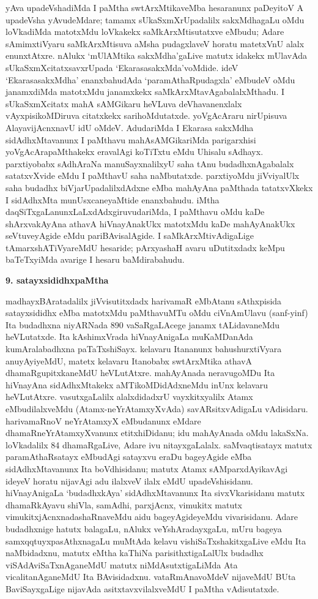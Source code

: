 yAva upadeVshadiMda I paMtha swtArxMtikaveMba hesaranunx paDeyitoV A upadeVsha yAvudeMdare; tamamx sUkaSxmXrUpadalilx sakxMdhagaLu oMdu loVkadiMda matotxMdu loVkakekx saMkArxMtisutatxve eMbudu; Adare sAmimxtiVyaru saMkArxMtisuva aMsha pudagxlaveV horatu matetxVnU alalx enunxtAtxre. nAlukx `mUlAMtika sakxMdha'gaLive matutx idakekx mUlavAda sUkaSxmXcitatxsavxrUpada `EkarasasakxMda'voMdide. ideV `EkarasasakxMdha' enanxbahudAda `paramAthaRpudagxla' eMbudeV oMdu janamxdiMda matotxMdu janamxkekx saMkArxMtavAgabalalxMthadu. I sUkaSxmXcitatx mahA sAMGikaru heVLuva deVhavanenxlalx vAyxpisikoMDiruva citatxkekx sarihoMdutatxde. yoVgAcAraru nirUpisuva AlayavijAcnxnavU idU oMdeV. AdudariMda I Ekarasa sakxMdha sidAdhxMtavanunx I paMthavu mahAsAMGikariMda parigarxhisi yoVgAcArapaMthakekx eravalAgi koTiTxtu eMdu Uhisalu sAdhayx. parxtiyobabx sAdhAraNa manuSayxnalilxyU saha tAnu budadhxnAgabalalx satatxvXvide eMdu I paMthavU saha naMbutatxde. parxtiyoMdu jiVviyalUlx saha budadhx biVjarUpadalilxdAdxne eMba mahAyAna paMthada tatatxvXkekx I sidAdhxMta munUsxcaneyaMtide enanxbahudu. iMtha daqSiTxgaLanunxLaLxdAdxgiruvudariMda, I paMthavu oMdu kaDe shArxvakAyAna athavA hiVnayAnakUkx matotxMdu kaDe mahAyAnakUkx seVtuveyAgide eMdu pariBAvisalAgide. I saMkArxMtivAdigaLige tAmarxshATiVyareMdU hesaride; pArxyashaH avaru uDutitxdadx keMpu baTeTxyiMda avarige I hesaru baMdirabahudu.

\smallskip
\begin{center}
{\textbf{\Large 9. satayxsididhxpaMtha}}
\end{center}

madhayxBAratadalilx jiVvisutitxdadx harivamaR eMbAtanu sAthxpisida satayxsididhx eMba matotxMdu paMthavuMTu oMdu ciVnAmUlavu (sanf-yinf) Ita budadhxna niyAR\-Nada 890 vaSaRgaLAcege janamx tALidavaneMdu heVLutatxde. Ita kAshimxVrada hiVnayAni\-gaLa muKaMDanAda kumAralabadhxna paTaTxshiSayx. kelavaru Itananunx bahu\-shurxtiVyara anu\-yAyiyeMdU, matetx kelavaru Itanobabx swtArxMtika athavA dhamaRgupitxkaneMdU heVLutAtxre. mahAyAnada neravugoMDu Ita hiVnayAna sidAdhxM\-takekx aMTikoMDi\-dAdxneMdu inUnx kelavaru heVLutAtxre. vasutxgaLalilx alalxdidadxrU vayxkitx\-yalilx Atamx eMbu\-dilalxveMdu (Atamx-neYrAtamxyXvAda) savARsitxvAdigaLu vAdisidaru. hari\-vamaRnoV neYrAtamxyX eMbudanunx eMdare dhamaRneYrAtamxyXvanunx etitxhiDidanu; idu mahAyAnada oMdu lakaSxNa. loVkadalilx 84 dhamaRgaLive, Adare ivu nitayxgaLalalx. saMvaqtisatayx matutx paramAthaRsatayx eMbudAgi satayxvu eraDu bageyAgide eMba sidAdhxMta\-vanunx Ita boVdhisidanu; matutx Atamx sAMparxdAyikavAgi ideyeV \hbox{horatu} nijavAgi adu ilalxveV ilalx eMdU upadeVshisidanu. hiVnayAnigaLa `budadhxkAya' sidAdhxMtavanunx Ita sivxVkarisidanu matutx dhamaRkAyavu shiVla, samAdhi, parxjAcnx, \hbox{vimukitx} matutx vimukitxjAcnxnadashaRnaveMdu aidu bageyAgideyeMdu vivarisidanu. Adare budadhx\-nige hatutx balagaLu, nAlukx veYshAradayxgaLu, mUru bageya samxqqtuyxpa\-sAthxnagaLu muMtAda kelavu vishiSaTxshakitxgaLive eMdu Ita naMbidadxnu, matutx eMtha kaThiNa parisithxti\-gaLalUlx \hbox{budadhx} viSAdAviSaTxnAganeMdU matutx niMdAsutxtigaLiMda Ata vicalitanAganeMdU Ita BAvisi\-dadxnu. vataRmAnavoMdeV nijaveMdU BUta BaviSayxgaLige nijavAda asitxtavx\-vilalxveMdU I paMtha vAdisutatxde.

